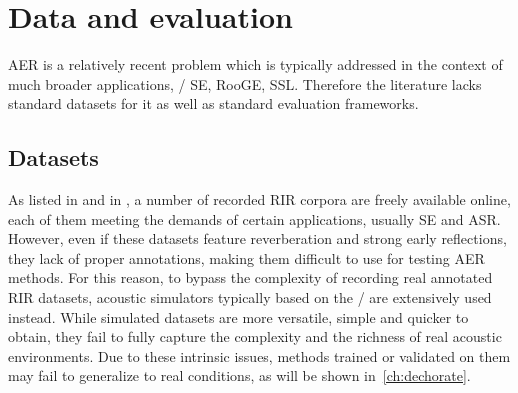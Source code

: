 \section{Data and evaluation}\label{sec:estimation:datametrics}
\ac{AER} is a relatively recent problem which is typically addressed in the context of much broader applications, \eg/ \ac{SE}, \ac{RooGE}, \ac{SSL}.
Therefore the literature lacks standard datasets for it as well as standard evaluation frameworks.

\subsection{Datasets}\label{sec:estimation:datasets}
As listed in  and in , a number of recorded \ac{RIR} corpora are freely available online, each of them meeting the demands of certain applications, usually \ac{SE} and \ac{ASR}.
However, even if these datasets feature reverberation and strong early reflections, they lack of proper annotations, making them difficult to use for testing \ac{AER} methods.
For this reason, to bypass the complexity of recording real annotated \ac{RIR} datasets, acoustic simulators typically based on the \ISM/ are extensively used instead.
While simulated datasets are more versatile, simple and quicker to obtain, they fail to fully capture the complexity and the richness of real acoustic environments.
Due to these intrinsic issues, methods trained or validated on them may fail to generalize to real conditions, as will be shown in~\cref{ch:dechorate}.

